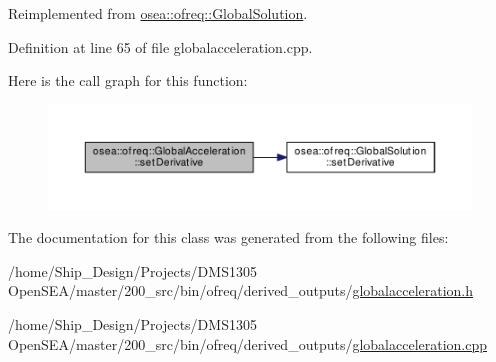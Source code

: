 Reimplemented from \hyperlink{classosea_1_1ofreq_1_1_global_solution_a537163391f1f55d073720b20f69acfa5}{osea\-::ofreq\-::\-Global\-Solution}.



Definition at line 65 of file globalacceleration.\-cpp.



Here is the call graph for this function\-:\nopagebreak
\begin{figure}[H]
\begin{center}
\leavevmode
\includegraphics[width=350pt]{classosea_1_1ofreq_1_1_global_acceleration_a14a041ea42d4c1bc10211c9a44aa3431_cgraph}
\end{center}
\end{figure}




The documentation for this class was generated from the following files\-:\begin{DoxyCompactItemize}
\item 
/home/\-Ship\-\_\-\-Design/\-Projects/\-D\-M\-S1305 Open\-S\-E\-A/master/200\-\_\-src/bin/ofreq/derived\-\_\-outputs/\hyperlink{globalacceleration_8h}{globalacceleration.\-h}\item 
/home/\-Ship\-\_\-\-Design/\-Projects/\-D\-M\-S1305 Open\-S\-E\-A/master/200\-\_\-src/bin/ofreq/derived\-\_\-outputs/\hyperlink{globalacceleration_8cpp}{globalacceleration.\-cpp}\end{DoxyCompactItemize}

